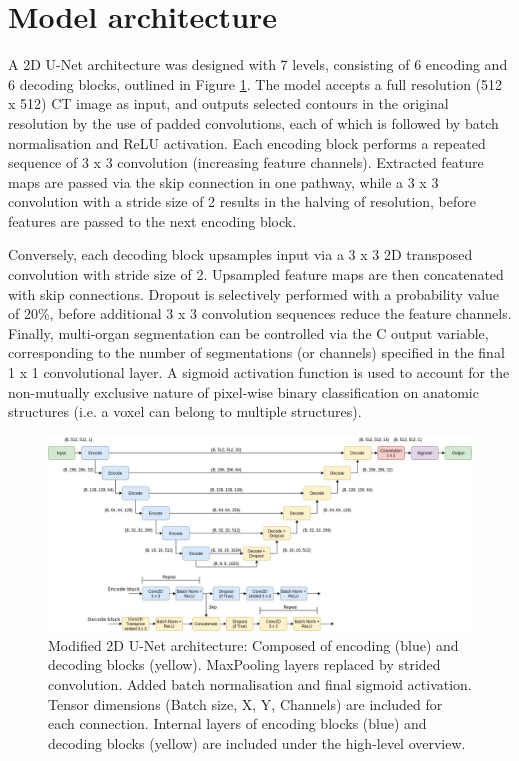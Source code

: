 \section{Model architecture}
\label{ch:method-architecture}
A 2D U-Net architecture was designed  with 7 levels, consisting of 6 encoding and 6 decoding blocks, outlined in Figure \ref{fig:model}. The model accepts a full resolution (512 x 512) CT image as input, and outputs selected contours in the original resolution by the use of padded convolutions, each of which is followed by batch normalisation and ReLU activation. Each encoding block performs a repeated sequence of 3 x 3 convolution (increasing feature channels). Extracted feature maps are passed via the skip connection in one pathway, while a 3 x 3 convolution with a stride size of 2 results in the halving of resolution, before features are passed to the next encoding block.

Conversely, each decoding block upsamples input via a 3 x 3 2D transposed convolution with stride size of 2. Upsampled feature maps are then concatenated with skip connections. Dropout is selectively performed with a probability value of 20\%, before additional 3 x 3 convolution sequences reduce the feature channels. Finally, multi-organ segmentation can be controlled via the C output variable, corresponding to the number of segmentations (or channels) specified in the final 1 x 1 convolutional layer. A sigmoid activation function is used to account for the non-mutually exclusive nature
of pixel-wise binary classification on anatomic structures (i.e. a voxel can belong to multiple structures).

\begin{figure}[H]
	\begin{center}
		\hspace*{-1.3cm}\includegraphics[width=1.15\textwidth]{figures/model_diagram}
		\caption{Modified 2D U-Net architecture: Composed of encoding (blue) and decoding blocks (yellow). MaxPooling layers replaced by strided convolution. Added batch normalisation and final sigmoid activation. Tensor dimensions (Batch size, X, Y, Channels) are included for each connection. Internal layers of encoding blocks (blue) and decoding blocks (yellow) are included under the high-level overview.}
		\label{fig:model}
	\end{center}
\end{figure}

